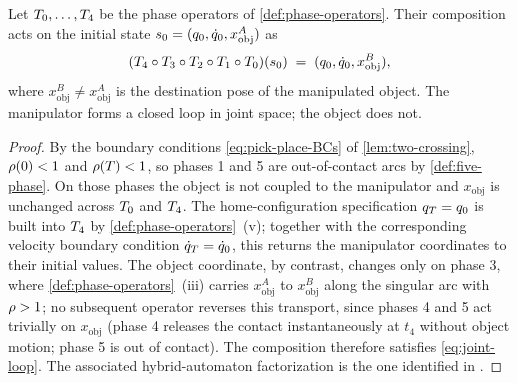 \begin{theorem}
\label{thm:joint-loop}
Let $T_{0}, \ldots, T_{4}$ be the phase operators of
\cref{def:phase-operators}. Their composition acts on the initial
state
$s_{0} = (q_{0}, \dot{q}_{0},
x_{\mathrm{obj}}^{A})$
as
\begin{equation}
\label{eq:joint-loop}
  (T_{4} \circ T_{3} \circ T_{2} \circ
   T_{1} \circ T_{0})(s_{0})
  \;=\; (q_{0}, \dot{q}_{0},
         x_{\mathrm{obj}}^{B}),
\end{equation}
where $x_{\mathrm{obj}}^{B} \neq x_{\mathrm{obj}}^{A}$ is the
destination pose of the manipulated object. The manipulator
forms a closed loop in joint space; the object does not.
\end{theorem}

\begin{proof}
By the boundary conditions \eqref{eq:pick-place-BCs} of
\cref{lem:two-crossing}, $\rho(0) < 1$ and $\rho(T) <
1$, so phases 1 and 5 are out-of-contact arcs by
\cref{def:five-phase}. On those phases the object is not
coupled to the manipulator and $x_{\mathrm{obj}}$ is unchanged
across $T_{0}$ and $T_{4}$. The home-configuration
specification $q_{T} = q_{0}$ is built into
$T_{4}$ by \cref{def:phase-operators}~(v); together with
the corresponding velocity boundary condition
$\dot{q}_{T} = \dot{q}_{0}$, this returns the
manipulator coordinates to their initial values. The object
coordinate, by contrast, changes only on phase 3, where
\cref{def:phase-operators}~(iii) carries $x_{\mathrm{obj}}^{A}$
to $x_{\mathrm{obj}}^{B}$ along the singular arc with $\rho
> 1$; no subsequent operator reverses this transport, since
phases 4 and 5 act trivially on $x_{\mathrm{obj}}$ (phase 4
releases the contact instantaneously at $t_{4}$ without object
motion; phase 5 is out of contact). The composition therefore
satisfies \eqref{eq:joint-loop}. The associated hybrid-automaton
factorization is the one identified in \citet{Lygeros2003}.
\end{proof}

